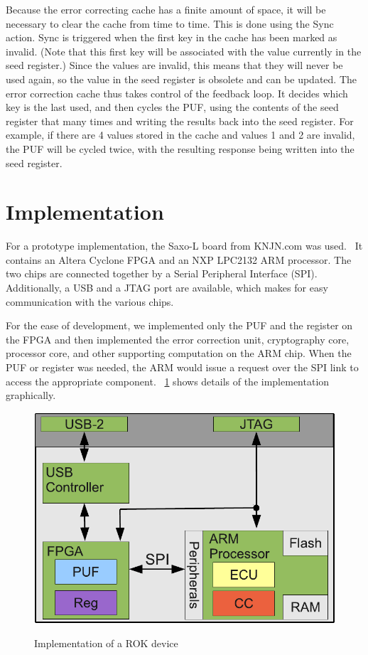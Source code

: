 Because the error correcting cache has a finite amount of space, it will be necessary to clear the cache from time to
time. This is done using the Sync action. Sync is triggered when the first key in the cache has been marked as invalid.
(Note that this first key will be associated with the value currently in the seed register.) Since the values are invalid,
this means that they will never be used again, so the value in the seed register is obsolete and can be updated.
The error correction cache thus takes control of the feedback loop. It decides which key is the last used, and then cycles
the PUF, using the contents of the seed register that many times and writing the results back into the seed register.
For example, if there are 4 values stored in the cache and values 1 and 2 are invalid, the PUF will be cycled twice,
with the resulting response being written into the seed register.

\section{Implementation}
For a prototype implementation, the Saxo-L board from KNJN.com was used.~\cite{KNJN} It contains an Altera
Cyclone FPGA and an NXP LPC2132 ARM processor. The two chips are connected together by a Serial Peripheral
Interface (SPI). Additionally, a USB and a JTAG port are available, which makes for easy communication with the
various chips.

For the ease of development, we implemented only the PUF and the register on the FPGA and then implemented
the error correction unit, cryptography core, processor core, and other supporting computation on the ARM chip. 
When the PUF or register was needed, the ARM would issue a request over the SPI link to access the appropriate component.
~\ref{fig:rokimpl} shows details of the implementation graphically.

\begin{figure}[!ht]
\includegraphics[width=500px]{images/rok.pdf}
\label{fig:rokimpl}
\caption{Implementation of a ROK device}
\end{figure}
\FloatBarrier

